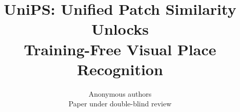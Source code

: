 \documentclass{article} %
\title{UniPS: Unified Patch Similarity Unlocks\\Training-Free Visual Place Recognition}
\author{Anonymous authors \\ Paper under double-blind review}
\newcommand{\method}{UniPS}
\begin{document}
\maketitle

\begin{abstract}


\end{abstract}
\end{document}
